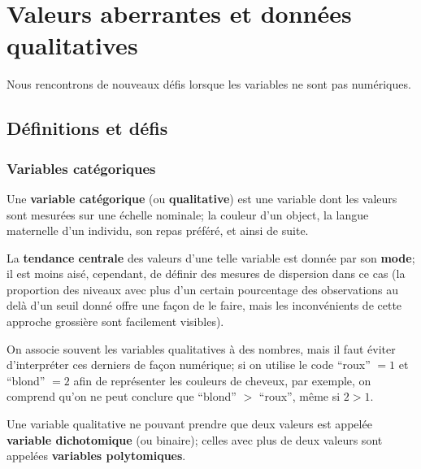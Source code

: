 \section{Valeurs aberrantes et données qualitatives}  \label{Section:3}
Nous rencontrons de nouveaux défis lorsque les variables ne sont pas num\'eriques. 
\subsection{D\'efinitions et défis}

\subsubsection*{Variables catégoriques}
Une \textbf{variable catégorique} (ou \textbf{qualitative}) est une variable dont les valeurs sont mesurées sur une échelle nominale; la couleur d'un object, la langue maternelle d'un individu, son repas préféré, et ainsi de suite.

La \textbf{tendance centrale} des valeurs d'une telle variable est donnée par son \textbf{mode};
 il est moins ais\'e, cependant, de d\'efinir des mesures de dispersion dans ce cas (la proportion des niveaux avec plus d'un certain pourcentage des observations au del\`a d'un seuil donn\'e offre une fa\c{c}on de le faire, mais les inconv\'enients de cette approche grossi\`ere sont facilement visibles).
 
On associe souvent les variables qualitatives \`a des nombres, mais il faut \'eviter d'interpr\'eter ces derniers de  fa\c{c}on numérique; si on utilise le code  ``roux'' $=1$ et ``blond'' $=2$ afin de repr\'esenter les couleurs de cheveux, par exemple, on comprend qu'on ne peut conclure que ``blond'' $>$ ``roux'', m\^eme si $2>1$.   

Une variable qualitative ne pouvant prendre que deux valeurs est appelée \textbf{variable dichotomique} (ou binaire); celles avec plus de deux valeurs sont appelées \textbf{variables polytomiques}. %

